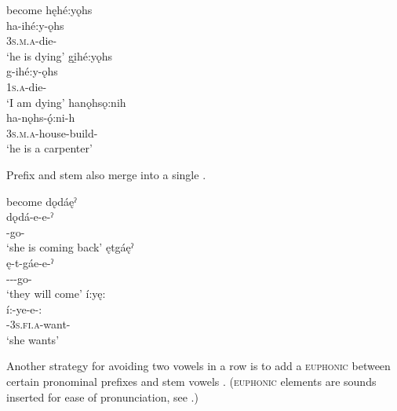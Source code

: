 \ea\label{ex:wdsoundchangex7}  become 
\ea hęhé:yǫhs\\\label{ex:wdsoundchangex7a}
\gll ha-ihé:y-ǫhs\\
 \textsc{3s.m.a}-die-{\habitual}\\
\glt `he is dying'
\ex gi̱hé:yǫhs\\\label{ex:wdsoundchangex7b}
\gll g-ihé:y-ǫhs\\
 \textsc{1s.a}-die-{\habitual}\\
\glt `I am dying'
\ex hanǫhsǫ:nih\\\label{ex:wdsoundchangex7c}
\gll ha-nǫhs-ǫ́:ni-h\\
 \textsc{3s.m.a}-house-build-{\habitual}\\
\glt `he is a carpenter'
\z
\z

Prefix  and stem  also merge into a single  . 

\ea\label{ex:wdsoundchangex8}  become 
\ea dǫdáęˀ\\
\gll dǫdá-e-e-ˀ\\
 {\dualicfactualcislocative}-go-{\punctual}\\
\glt `she is coming back'
\ex ętgáęˀ\\
\gll ę-t-gáe-e-ˀ\\
 \fut-{\cislocative}--go-{\punctual}\\
\glt `they will come'
\ex í:yę:\\
\gll í:-ye-e-:\\
 {\prothetic}-\textsc{3s.fi.a}-want-{\stative}\\
\glt `she wants'
\z
\z

Another strategy for avoiding two vowels in a row is to add a \textsc{euphonic}  between certain pronominal prefixes and stem vowels . (\textsc{euphonic} elements are sounds inserted for ease of pronunciation, see .)
 
